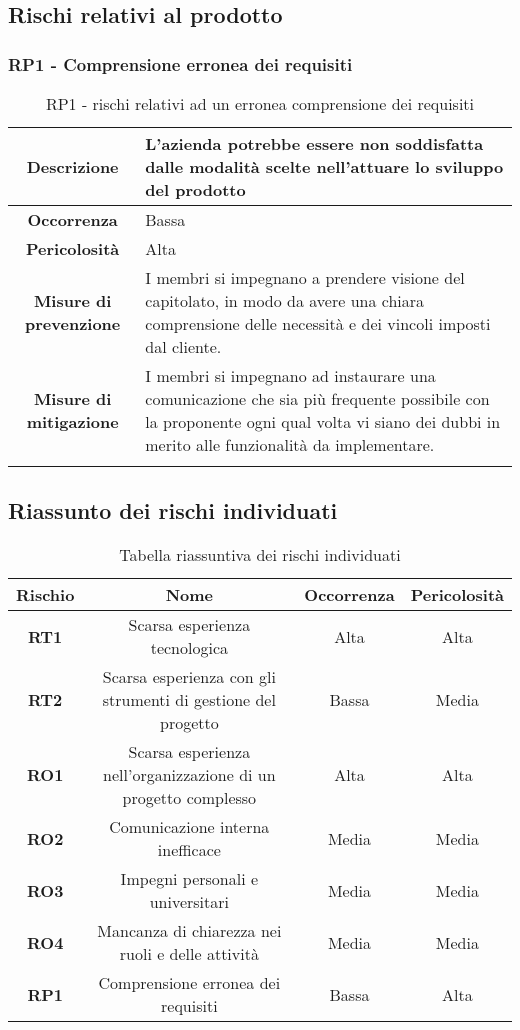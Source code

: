 \subsection{Rischi relativi al prodotto}
%
%
\subsubsection[RP1]{RP1 - Comprensione erronea dei requisiti}\label{rp:1}
\begin{longtable}{|c|p{12cm}|}
\hline
\textbf{Descrizione} & L'azienda potrebbe essere non soddisfatta dalle modalità scelte nell'attuare lo sviluppo del prodotto\\
\hline
\textbf{Occorrenza} & Bassa \\
\hline
\textbf{Pericolosità} & Alta \\
\hline
\textbf{Misure di prevenzione} & I membri si impegnano a prendere visione del capitolato, in modo da avere una chiara comprensione delle necessità e dei vincoli imposti dal cliente. \\
\hline
\textbf{Misure di mitigazione} &  I membri si impegnano ad instaurare una comunicazione che sia più frequente possibile con la proponente ogni qual volta vi siano dei dubbi in merito alle funzionalità da implementare.\\
\hline
\caption{RP1 - rischi relativi ad un erronea comprensione dei requisiti}
\end{longtable}

\subsection{Riassunto dei rischi individuati}
\begin{table}[h]
\centering
\begin{tabular}{|c|c|c|c|}
\hline
\textbf{Rischio} & \textbf{Nome} & \textbf{Occorrenza} & \textbf{Pericolosità} \\
\hline
\textbf{RT1} & Scarsa esperienza tecnologica & Alta & Alta \\
\hline
\textbf{RT2} & Scarsa esperienza con gli strumenti di gestione del progetto & Bassa & Media \\
\hline
\textbf{RO1} & Scarsa esperienza nell’organizzazione di un progetto complesso & Alta & Alta \\
\hline
\textbf{RO2} & Comunicazione interna inefficace & Media & Media \\
\hline
\textbf{RO3} & Impegni personali e universitari & Media & Media \\
\hline
\textbf{RO4} & Mancanza di chiarezza nei ruoli e delle attività & Media & Media \\
\hline
\textbf{RP1} & Comprensione erronea dei requisiti & Bassa & Alta \\
\hline
\end{tabular}
\caption{Tabella riassuntiva dei rischi individuati}
\label{tab:rischi}
\end{table}